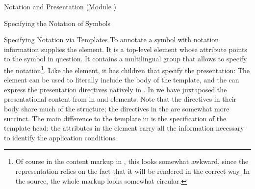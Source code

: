 \begin{tchapter}[id=pres,short=Notation and Presentation]{Notation and Presentation (Module {})}
\begin{tsection}[id=presentation,short=Notation of Symbols]{Specifying the Notation of Symbols}
\begin{tsubsection}[id=pres-templates]{Specifying Notation via Templates}
  To annotate a symbol with notation information {\omdoc} supplies the
  {} element. It is a top-level element whose
  {} attribute points to the symbol in question. It contains
  a multilingual {} group that allows to specify the notation\footnote{Of
    course in the content markup in {\omdoc}, this looks somewhat awkward, since the
    representation relies on the fact that it will be rendered in the correct way. In the
    source, the whole markup looks somewhat circular.}.  Like the {}
  element, it has children that specify the presentation: The {} element can
  be used to literally include the body of the template, and the {} can
  express the presentation directives natively in {\omdoc}. In {}
  we have juxtaposed the presentational content from {} in
  {} and {} elements. Note that the directives in their body
  share much of the structure; the directives in the {} are somewhat more
  succinct. The main difference to the {\xslt} template in {} is the
  specification of the template head: the attributes in the {}
  element carry all the information necessary to identify the application conditions.


\end{tsubsection}
\end{tsection}
\end{tchapter}
